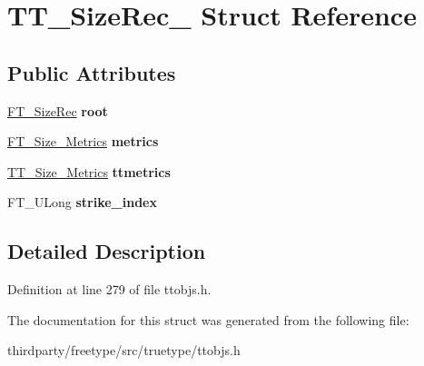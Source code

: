 \hypertarget{struct_t_t___size_rec__}{}\section{T\+T\+\_\+\+Size\+Rec\+\_\+ Struct Reference}
\label{struct_t_t___size_rec__}
\subsection*{Public Attributes}
\begin{DoxyCompactItemize}
\item 
\mbox{\label{struct_t_t___size_rec___a36e72cb2eeee674cd0b2627b1bc78290}} 
\hyperlink{struct_f_t___size_rec__}{F\+T\+\_\+\+Size\+Rec} {\bfseries root}
\item 
\mbox{\label{struct_t_t___size_rec___a2c318c9d8f391ff4dc4d395b079e0322}} 
\hyperlink{struct_f_t___size___metrics__}{F\+T\+\_\+\+Size\+\_\+\+Metrics} {\bfseries metrics}
\item 
\mbox{\label{struct_t_t___size_rec___aa2f032928315810cdbfad22217850d16}} 
\hyperlink{struct_t_t___size___metrics__}{T\+T\+\_\+\+Size\+\_\+\+Metrics} {\bfseries ttmetrics}
\item 
\mbox{\label{struct_t_t___size_rec___acea9d3f6b45ce6472a3c804125aa914f}} 
F\+T\+\_\+\+U\+Long {\bfseries strike\+\_\+index}
\end{DoxyCompactItemize}


\subsection{Detailed Description}


Definition at line 279 of file ttobjs.\+h.



The documentation for this struct was generated from the following file\+:\begin{DoxyCompactItemize}
\item 
thirdparty/freetype/src/truetype/ttobjs.\+h\end{DoxyCompactItemize}
